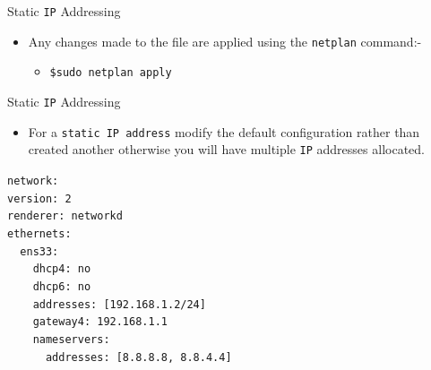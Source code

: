 \documentclass[aspectratio=169]{beamer}
\begin{document}
\begin{frame}{Static \texttt{IP} Addressing}
  \begin{itemize}
    \item Any changes made to the file are applied using the \texttt{netplan} command:-
    \begin{itemize}
      \item \texttt{\$sudo netplan apply}
    \end{itemize}
  \end{itemize}
\end{frame}

\begin{frame}{Static \texttt{IP} Addressing}
  \begin{itemize}
    \item For a \texttt{static IP address} modify the default configuration rather than created another otherwise you will have multiple \texttt{IP} addresses allocated.
  \end{itemize}
  \begin{center}
    \begin{minipage}{9cm}
      \begin{block}{}
        \texttt{network:\\
        version: 2\\
        renderer: networkd\\
        ethernets:\\
        ~~ens33:\\
        ~~~~dhcp4: no\\
        ~~~~dhcp6: no\\
        ~~~~addresses: [192.168.1.2/24]\\
        ~~~~gateway4: 192.168.1.1\\
        ~~~~nameservers:\\
        ~~~~~~addresses: [8.8.8.8, 8.8.4.4]}
      \end{block}
    \end{minipage}
  \end{center}
\end{frame}
\end{document}
